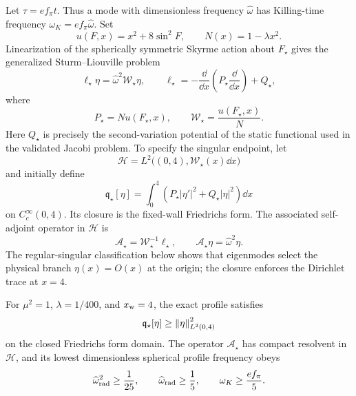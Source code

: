 Let $\tau=e f_\pi t$.  Thus a mode with dimensionless frequency
$\widehat\omega$ has Killing-time frequency
$\omega_K=e f_\pi\widehat\omega$.  Set
\begin{equation}
 u(F,x)=x^2+8\sin^2F,
 \qquad N(x)=1-\lambda x^2.
\end{equation}
Linearization of the spherically symmetric Skyrme action about $F_\star$ gives
the generalized Sturm--Liouville problem
\begin{equation}
 \ell_\star\eta
   =\widehat\omega^{2}\mathcal W_\star\eta,
 \qquad
 \ell_\star=-\frac{\dd}{\dd x}
       \left(P_\star\frac{\dd}{\dd x}\right)+Q_\star,
 \label{eq:radial-sturm-liouville}
\end{equation}
where
\begin{equation}
 P_\star=N u(F_\star,x),
 \qquad
 \mathcal W_\star=\frac{u(F_\star,x)}{N}.
 \label{eq:radial-weights}
\end{equation}
Here $Q_\star$ is precisely the second-variation potential of the static
functional used in the validated Jacobi problem.  To specify the singular
endpoint, let
\begin{equation}
 \mathscr H=L^2\bigl((0,4),\mathcal W_\star(x)\dd x\bigr)
\end{equation}
and initially define
\begin{equation}
 \mathfrak q_\star[\eta]
 =\int_0^4\left(P_\star|\eta'|^2+Q_\star|\eta|^2\right)\dd x
 \label{eq:radial-quadratic-form}
\end{equation}
on $C_c^\infty(0,4)$.  Its closure is the fixed-wall Friedrichs form.  The
associated self-adjoint operator in $\mathscr H$ is
\begin{equation}
 \mathcal A_\star=\mathcal W_\star^{-1}\ell_\star,
 \qquad \mathcal A_\star\eta=\widehat\omega^2\eta.
 \label{eq:radial-self-adjoint-operator}
\end{equation}
The regular-singular classification below shows that eigenmodes
select the physical branch $\eta(x)=O(x)$ at the origin; the closure enforces
the Dirichlet trace at $x=4$.

\begin{proposition}
\label{prop:fixed-wall-gap}
For $\mu^2=1$, $\lambda=1/400$, and $x_{\rm w}=4$, the exact profile satisfies
\begin{equation}
 \mathfrak q_\star[\eta]
 \geq \left\lVert\eta\right\rVert_{L^2(0,4)}^2
 \label{eq:static-form-gap}
\end{equation}
on the closed Friedrichs form domain.  The operator $\mathcal A_\star$ has compact
resolvent in $\mathscr H$, and its lowest dimensionless spherical profile
frequency obeys
\begin{equation}
 \widehat\omega_{\rm rad}^2\geq\frac1{25},
 \qquad
 \widehat\omega_{\rm rad}\geq\frac15,
 \qquad
 \omega_{K}\geq\frac{e f_\pi}{5}.
 \label{eq:fixed-wall-frequency-gap}
\end{equation}
\end{proposition}

